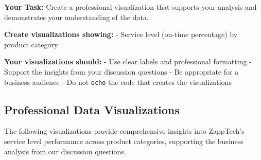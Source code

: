 \documentclass[
  letterpaper,
  DIV=11,
  numbers=noendperiod]{scrartcl}
\begin{document}
\textbf{Your Task:} Create a professional visualization that supports
your analysis and demonstrates your understanding of the data.

\textbf{Create visualizations showing:} - Service level (on-time
percentage) by product category

\textbf{Your visualizations should:} - Use clear labels and professional
formatting - Support the insights from your discussion questions - Be
appropriate for a business audience - Do not \texttt{echo} the code that
creates the visualizations

\subsection{Professional Data
Visualizations}\label{professional-data-visualizations}

The following visualizations provide comprehensive insights into
ZappTech's service level performance across product categories,
supporting the business analysis from our discussion questions.
\end{document}
